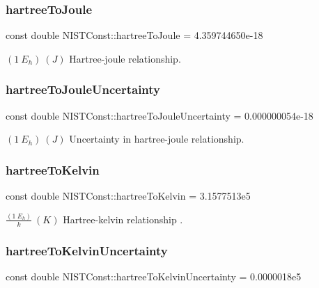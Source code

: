 \subsubsection{\texorpdfstring{hartree\+To\+Joule}{hartreeToJoule}}
{\footnotesize\ttfamily const double N\+I\+S\+T\+Const\+::hartree\+To\+Joule = 4.\+359744650e-\/18}

$(1\ E_h) \ (J)$ Hartree-\/joule relationship. \mbox{\label{group___n_i_s_t_const-_hartree_ga2e016fc3c1dbb3e68befcfb929034c85}} 
\subsubsection{\texorpdfstring{hartree\+To\+Joule\+Uncertainty}{hartreeToJouleUncertainty}}
{\footnotesize\ttfamily const double N\+I\+S\+T\+Const\+::hartree\+To\+Joule\+Uncertainty = 0.\+000000054e-\/18}

$(1\ E_h) \ (J)$ Uncertainty in hartree-\/joule relationship. \mbox{\label{group___n_i_s_t_const-_hartree_ga5468b69d29f43719e4642f9c5248e546}} 
\subsubsection{\texorpdfstring{hartree\+To\+Kelvin}{hartreeToKelvin}}
{\footnotesize\ttfamily const double N\+I\+S\+T\+Const\+::hartree\+To\+Kelvin = 3.\+1577513e5}

$\frac{(1\ E_h)}{k} \ (K)$ Hartree-\/kelvin relationship . \mbox{\label{group___n_i_s_t_const-_hartree_gace6578c3f664e11b0eba73a20efd7f16}} 
\subsubsection{\texorpdfstring{hartree\+To\+Kelvin\+Uncertainty}{hartreeToKelvinUncertainty}}
{\footnotesize\ttfamily const double N\+I\+S\+T\+Const\+::hartree\+To\+Kelvin\+Uncertainty = 0.\+0000018e5}

